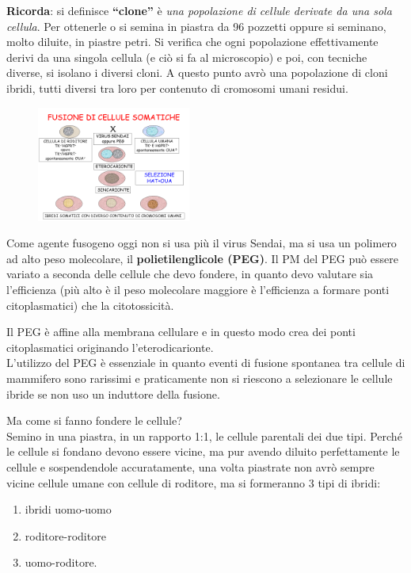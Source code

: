 \documentclass[11pt]{book}
\begin{document}
\textbf{Ricorda}: si definisce \textbf{``clone''} è \emph{una popolazione di cellule derivate da una sola cellula}. Per ottenerle o si semina in piastra da 96 pozzetti oppure si seminano, molto diluite, in piastre petri. Si verifica che ogni popolazione effettivamente derivi da una singola cellula (e ciò si fa al microscopio) e poi, con tecniche diverse, si isolano i diversi cloni. A questo punto avrò una popolazione di cloni ibridi, tutti diversi tra loro per contenuto di cromosomi umani residui.

\begin{figure}
\centering
\includegraphics[width=0.45\textwidth]{img/32_fusione_cellule_somatiche.png}
  \caption{}
\end{figure}

Come agente fusogeno oggi non si usa più il virus Sendai, ma si usa un polimero ad alto peso molecolare, il \textbf{polietilenglicole (PEG)}. Il PM del PEG può essere variato a seconda delle cellule che devo fondere, in quanto devo valutare sia l’efficienza (più alto è il peso molecolare maggiore è l’efficienza a formare ponti citoplasmatici) che la citotossicità.

Il PEG è affine alla membrana cellulare e in questo modo crea dei ponti citoplasmatici originando l’eterodicarionte.\\
L'utilizzo del PEG è essenziale in quanto eventi di fusione spontanea tra cellule di mammifero sono rarissimi e praticamente non si riescono a selezionare le cellule ibride se non uso un induttore della fusione. 

Ma come si fanno fondere le cellule?\\
Semino in una piastra, in un rapporto 1:1, le cellule parentali dei due tipi. Perché le cellule si fondano devono essere vicine, ma pur avendo diluito perfettamente le cellule e sospendendole accuratamente, una volta piastrate non avrò sempre vicine cellule umane con cellule di roditore, ma si formeranno 3 tipi di ibridi: 
\begin{enumerate}
\item ibridi uomo-uomo
\item roditore-roditore
\item uomo-roditore.
\end{enumerate}
\end{document}
